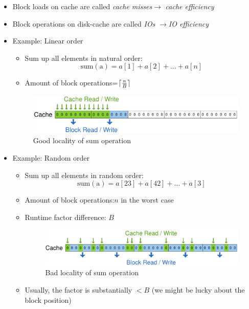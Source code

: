 \documentclass[12pt, a4paper]{scrartcl}
\newcommand{\imgwidth}{.7\textwidth}
\DeclarePairedDelimiter{\ceil}{\lceil}{\rceil}
\begin{document}
\begin{itemize}
\begin{itemize}
  \end{itemize}
\item Block loads on cache are called \emph{cache misses}$\rightarrow$ \emph{cache efficiency}
\item Block operations on disk-cache are called \emph{IOs} $\rightarrow$\emph{IO efficiency}
\item Example: Linear order
  \begin{itemize}
  \item Sum up all elements in natural order:
    \[\mathrm{sum(a)}=a[1]+a[2]+...+a[n]\]
  \item Amount of block operations=$\ceil{\frac{n}{B}}$
  \end{itemize}
  
  \begin{figure}[htbp]
    \centering
    \includegraphics[width=\imgwidth]{good_locality}
    \caption{Good locality of sum operation}
    \label{fig:good_locality}
  \end{figure}
  
\item Example: Random order
  \begin{itemize}
  \item Sum up all elements in random order:
    \[\mathrm{sum(a)}=a[23]+a[42]+...+a[3]\]
  \item Amount of block operations:$n$ in the worst case
  \item Runtime factor difference: $B$
    \begin{figure}[htbp]
      \centering
      \includegraphics[width=\imgwidth]{bad_locality}
      \caption{Bad locality of sum operation}
      \label{fig:bad_locality}
    \end{figure}
  \item Usually, the factor is substantially $< B$ (we might be lucky about the block position)
  \end{itemize}
\end{itemize}
\end{document}
